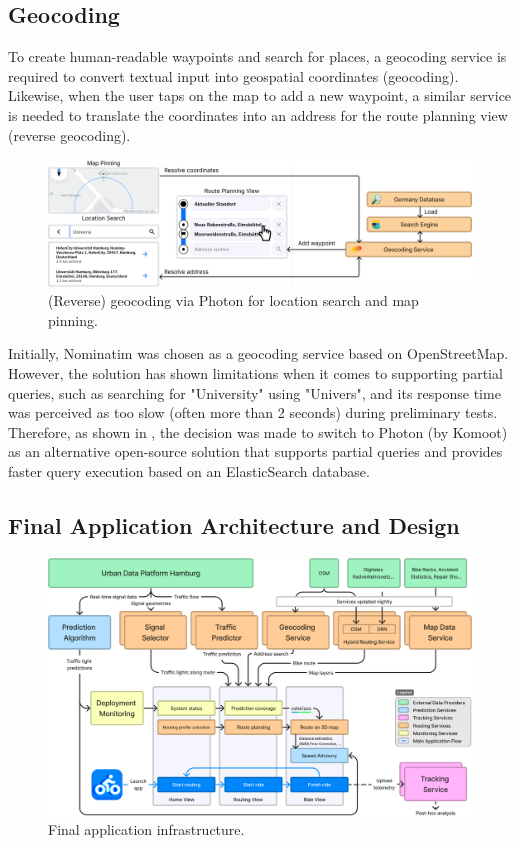 \subsection{Geocoding}

To create human-readable waypoints and search for places, a geocoding service is required to convert textual input into geospatial coordinates (geocoding). Likewise, when the user taps on the map to add a new waypoint, a similar service is needed to translate the coordinates into an address for the route planning view (reverse geocoding).

\begin{figure}[htbp]
\centering
\includegraphics[width=\linewidth]{images/routing-view-geocoding.png}
\caption{(Reverse) geocoding via Photon for location search and map pinning.}
\label{fig:routing-view-geocoding}
\end{figure}

Initially, Nominatim was chosen as a geocoding service based on OpenStreetMap. However, the solution has shown limitations when it comes to supporting partial queries, such as searching for "University" using "Univers", and its response time was perceived as too slow (often more than 2 seconds) during preliminary tests. Therefore, as shown in , the decision was made to switch to Photon (by Komoot) as an alternative open-source solution that supports partial queries and provides faster query execution based on an ElasticSearch database.

\subsection{Final Application Architecture and Design}


\begin{figure}[htbp]
\caption{Final application infrastructure.}\label{fig:architecture}
\includegraphics[width=\linewidth]{images/architecture.png}
\end{figure}

